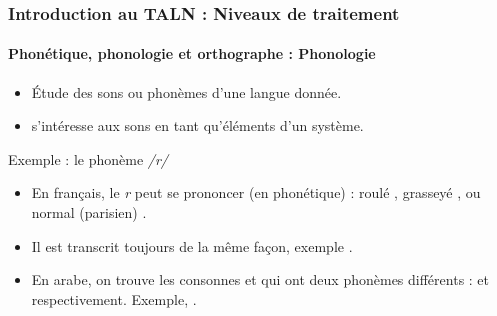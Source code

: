 \documentclass[xcolor=table]{beamer}
\begin{document}
\begin{frame}
\frametitle{Introduction au TALN : Niveaux de traitement}
\framesubtitle{Phonétique, phonologie et orthographe : Phonologie}

\begin{itemize}
	\item Étude des sons ou phonèmes d'une langue donnée.
	\item s'intéresse aux sons en tant qu'éléments d'un système.
\end{itemize}

\begin{exampleblock}{Exemple : le phonème \textit{/r/}}
	\begin{itemize}
		\item En français, le \textit{r} peut se prononcer (en phonétique) : roulé \expword{\textipa{[r]}}, grasseyé \expword{\textipa{[\;R]}}, ou normal (parisien) \expword{\textipa{[K]}}.
		\item Il est transcrit toujours de la même façon, exemple .
		\item En arabe, on trouve les consonnes  et  qui ont deux phonèmes différents :  et  respectivement. 
		Exemple, .
	\end{itemize}
\end{exampleblock}

\end{frame}
\end{document}
